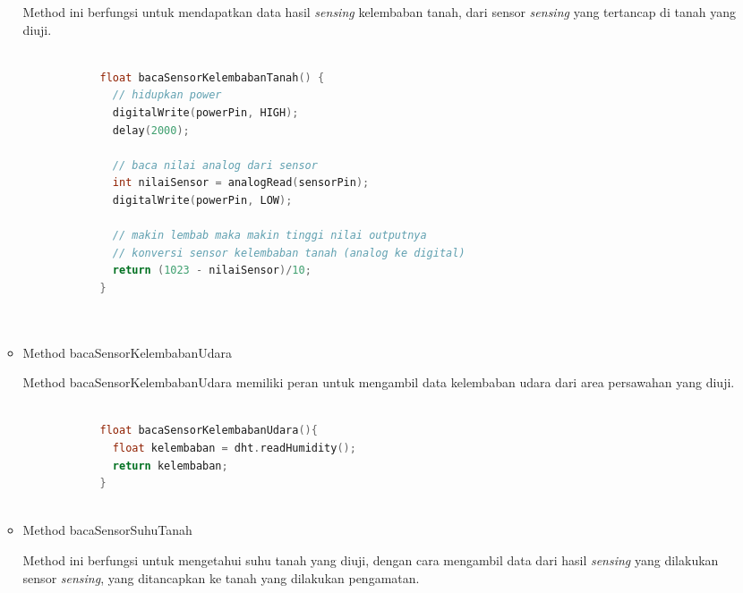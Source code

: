 \begin{itemize}
\begin{itemize}
            Method ini berfungsi untuk mendapatkan data hasil \textit{sensing} kelembaban tanah, dari sensor \textit{sensing} yang tertancap di tanah yang diuji.
            
            \begin{lstlisting}[label=bacaSensorKelembabanTanah, language=C, caption=Metode bacaSensorKelembabanTanah(), numbers=none]
            
            float bacaSensorKelembabanTanah() {
              // hidupkan power
              digitalWrite(powerPin, HIGH);
              delay(2000);
              
              // baca nilai analog dari sensor
              int nilaiSensor = analogRead(sensorPin);
              digitalWrite(powerPin, LOW);
              
              // makin lembab maka makin tinggi nilai outputnya
              // konversi sensor kelembaban tanah (analog ke digital)
              return (1023 - nilaiSensor)/10;
            }
            
            
            \end{lstlisting}
            
            \item Method bacaSensorKelembabanUdara
            
            Method bacaSensorKelembabanUdara memiliki peran untuk mengambil data kelembaban udara dari area persawahan yang diuji.
            
            \begin{lstlisting}[label=bacaSensorKelembabanUdara, language=C, caption=Metode bacaSensorKelembabanUdara(), numbers=none]
            
            float bacaSensorKelembabanUdara(){
              float kelembaban = dht.readHumidity();
              return kelembaban;
            }
            
            \end{lstlisting}
            
            \item Method bacaSensorSuhuTanah
            
            Method ini berfungsi untuk mengetahui suhu tanah yang diuji, dengan cara mengambil data dari hasil \textit{sensing} yang dilakukan sensor \textit{sensing}, yang ditancapkan ke tanah yang dilakukan pengamatan.
            
            \begin{lstlisting}[label=bacaSensorSuhuTanah, language=C, caption=Metode bacaSensorSuhuTanah(), numbers=none]
            

\end{lstlisting}
\end{itemize}
\end{itemize}
